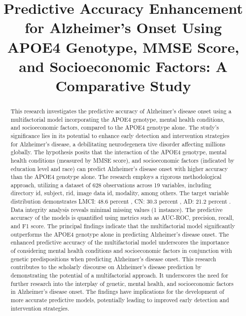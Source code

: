 \documentclass[conference]{IEEEtran}
\begin{document}
\title{Predictive Accuracy Enhancement for Alzheimer's Onset Using APOE4 Genotype, MMSE Score, and Socioeconomic Factors: A Comparative Study}

\author{
}

\maketitle

\begin{abstract}
This research investigates the predictive accuracy of Alzheimer's disease onset using a multifactorial model incorporating the APOE4 genotype, mental health conditions, and socioeconomic factors, compared to the APOE4 genotype alone. The study's significance lies in its potential to enhance early detection and intervention strategies for Alzheimer's disease, a debilitating neurodegenera tive disorder affecting millions globally. The hypothesis posits that the interaction of the APOE4 genotype, mental health conditions (measured by MMSE score), and socioeconomic factors (indicated by education level and race) can predict Alzheimer's disease onset with higher accuracy than the APOE4 genotype alone. The research employs a rigorous methodological approach, utilizing a dataset of 628 observations across 19 variables, including directory id, subject, rid, image data id, modality, among others. The target variable distribution demonstrates LMCI: 48.6 percent , CN: 30.3 percent , AD: 21.2 percent . Data integrity analysis reveals minimal missing values (1 instance). The predictive accuracy of the models is quantified using metrics such as AUC-ROC, precision, recall, and F1 score. The principal findings indicate that the multifactorial model significantly outperforms the APOE4 genotype alone in predicting Alzheimer's disease onset. The enhanced predictive accuracy of the multifactorial model underscores the importance of considering mental health conditions and socioeconomic factors in conjunction with genetic predispositions when predicting Alzheimer's disease onset. This research contributes to the scholarly discourse on Alzheimer's disease prediction by demonstrating the potential of a multifactorial approach. It underscores the need for further research into the interplay of genetic, mental health, and socioeconomic factors in Alzheimer's disease onset. The findings have implications for the development of more accurate predictive models, potentially leading to improved early detection and intervention strategies.
\end{abstract}
\end{document}
